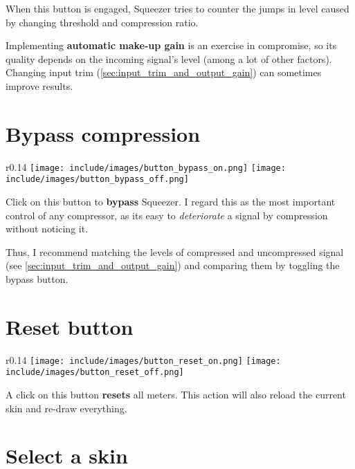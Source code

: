 When this button is engaged, Squeezer tries to counter the jumps in
level caused by changing threshold and compression ratio.

Implementing \textbf{automatic make-up gain} is an exercise in
compromise, so its quality depends on the incoming signal's level
(among a lot of other factors).  Changing input trim
(\ref{sec:input_trim_and_output_gain}) can sometimes improve results.

\newpage %

\section{Bypass compression}

\begin{wrapfigure}{r}{0.14\linewidth}
  \texttt{[image: include/images/button\_bypass\_on.png]}
  \newline \vspace{-0.9\baselineskip}
  \texttt{[image: include/images/button\_bypass\_off.png]}
\end{wrapfigure}

Click on this button to \textbf{bypass} Squeezer.  I regard this as
the most important control of any compressor, as its easy to
\emph{deteriorate} a signal by compression without noticing it.

Thus, I recommend matching the levels of compressed and uncompressed
signal (see \ref{sec:input_trim_and_output_gain}) and comparing them
by toggling the bypass button.

\section{Reset button}

\begin{wrapfigure}{r}{0.14\linewidth}
  \texttt{[image: include/images/button\_reset\_on.png]}
  \newline \vspace{-0.9\baselineskip}
  \texttt{[image: include/images/button\_reset\_off.png]}
\end{wrapfigure}

A click on this button \textbf{resets} all meters.  This action will
also reload the current skin and re-draw everything.

\section{Select a skin}

